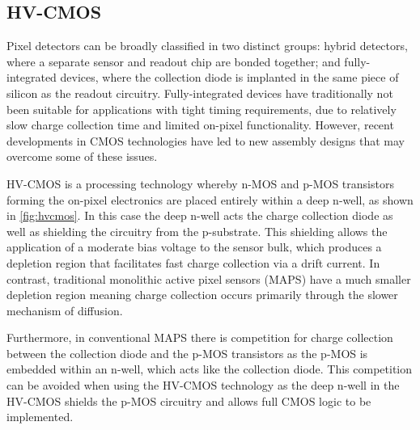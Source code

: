 \subsection{HV-CMOS}

Pixel detectors can be broadly classified in two distinct groups: hybrid detectors, where a separate sensor and readout chip are bonded together; and fully-integrated devices, where the collection diode is implanted in the same piece of silicon as the readout circuitry.  Fully-integrated devices have traditionally not been suitable for applications with tight timing requirements, due to relatively slow charge collection time and limited on-pixel functionality.  However, recent developments in CMOS technologies have led to new assembly designs that may overcome some of these issues. 


HV-CMOS is a processing technology whereby n-MOS and p-MOS transistors forming the on-pixel electronics are placed entirely within a deep n-well, as shown in \ref{fig:hvcmos}.  In this case the deep n-well acts the charge collection diode as well as shielding the circuitry from the p-substrate.  This shielding allows the application of a moderate bias voltage to the sensor bulk, which produces a depletion region that facilitates fast charge collection via a drift current.  In contrast, traditional monolithic active pixel sensors (MAPS) have a much smaller depletion region meaning charge collection occurs primarily through the slower mechanism of diffusion.  

Furthermore, in conventional MAPS there is competition for charge collection between the collection diode and the p-MOS transistors as the p-MOS is embedded within an n-well, which acts like the collection diode.  This competition can be avoided when using the HV-CMOS technology as the deep n-well in the HV-CMOS shields the p-MOS circuitry and allows full CMOS logic to be implemented.


